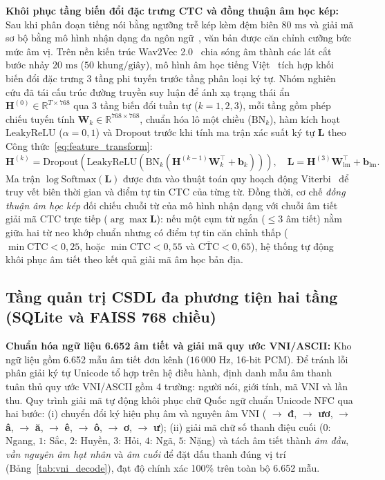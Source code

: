 \documentclass[12pt,a4paper]{article}
\begin{document}
\textbf{Khôi phục tầng biến đổi đặc trưng CTC và đồng thuận âm học kép:} Sau khi phân đoạn tiếng nói bằng ngưỡng trễ kép kèm đệm biên $80\text{ ms}$ và giải mã sơ bộ bằng mô hình nhận dạng đa ngôn ngữ~\cite{radford2023whisper}, văn bản được căn chỉnh cưỡng bức mức âm vị. Trên nền kiến trúc Wav2Vec 2.0~\cite{baevski2020wav2vec2} chia sóng âm thành các lát cắt bước nhảy $20\text{ ms}$ ($50\text{ khung/giây}$), mô hình âm học tiếng Việt~\cite{nguyen2021vlsp} tích hợp khối biến đổi đặc trưng 3 tầng phi tuyến trước tầng phân loại ký tự. Nhóm nghiên cứu đã tái cấu trúc đường truyền suy luận để ánh xạ trạng thái ẩn $\mathbf{H}^{(0)} \in \mathbb{R}^{T \times 768}$ qua 3 tầng biến đổi tuần tự ($k = 1, 2, 3$), mỗi tầng gồm phép chiếu tuyến tính $\mathbf{W}_k \in \mathbb{R}^{768 \times 768}$, chuẩn hóa lô một chiều ($\mathrm{BN}_k$), hàm kích hoạt $\mathrm{LeakyReLU}$ ($\alpha=0{,}1$) và $\mathrm{Dropout}$ trước khi tính ma trận xác suất ký tự $\mathbf{L}$ theo Công thức~\eqref{eq:feature_transform}:
\begin{equation}
\mathbf{H}^{(k)} = \mathrm{Dropout}\!\left(\mathrm{LeakyReLU}\!\left(\mathrm{BN}_k\!\left(\mathbf{H}^{(k-1)}\mathbf{W}_k^\top + \mathbf{b}_k\right)\right)\right), \quad \mathbf{L} = \mathbf{H}^{(3)}\mathbf{W}_{\mathrm{lm}}^\top + \mathbf{b}_{\mathrm{lm}}.
\label{eq:feature_transform}
\end{equation}
Ma trận $\log\mathrm{Softmax}(\mathbf{L})$ được đưa vào thuật toán quy hoạch động Viterbi~\cite{viterbi1967} để truy vết biên thời gian và điểm tự tin CTC của từng từ. Đồng thời, cơ chế \textit{đồng thuận âm học kép} đối chiếu chuỗi từ của mô hình nhận dạng với chuỗi âm tiết giải mã CTC trực tiếp ($\arg\max \mathbf{L}$): nếu một cụm từ ngắn ($\le 3$ âm tiết) nằm giữa hai từ neo khớp chuẩn nhưng có điểm tự tin căn chỉnh thấp ($\min\mathrm{CTC} < 0{,}25$, hoặc $\min\mathrm{CTC} < 0{,}55$ và $\overline{\mathrm{CTC}} < 0{,}65$), hệ thống tự động khôi phục âm tiết theo kết quả giải mã âm học bản địa.

\subsection{Tầng quản trị CSDL đa phương tiện hai tầng (SQLite và FAISS 768 chiều)}
\textbf{Chuẩn hóa ngữ liệu 6.652 âm tiết và giải mã quy ước VNI/ASCII:} Kho ngữ liệu gồm 6.652 mẫu âm tiết đơn kênh ($16\,000\text{ Hz}$, 16-bit PCM). Để tránh lỗi phân giải ký tự Unicode tổ hợp trên hệ điều hành, định danh mẫu âm thanh tuân thủ quy ước VNI/ASCII gồm 4 trường: người nói, giới tính, mã VNI và lần thu. Quy trình giải mã tự động khôi phục chữ Quốc ngữ chuẩn Unicode NFC qua hai bước: (i) chuyển đổi ký hiệu phụ âm và nguyên âm VNI ( $\to$ \textbf{đ},  $\to$ \textbf{ươ},  $\to$ \textbf{â},  $\to$ \textbf{ă},  $\to$ \textbf{ê},  $\to$ \textbf{ô},  $\to$ \textbf{ơ},  $\to$ \textbf{ư}); (ii) giải mã chữ số thanh điệu cuối ($0$: Ngang, $1$: Sắc, $2$: Huyền, $3$: Hỏi, $4$: Ngã, $5$: Nặng) và tách âm tiết thành \textit{âm đầu}, \textit{vần nguyên âm hạt nhân} và \textit{âm cuối} để đặt dấu thanh đúng vị trí (Bảng~\ref{tab:vni_decode}), đạt độ chính xác 100\% trên toàn bộ 6.652 mẫu.
\end{document}
